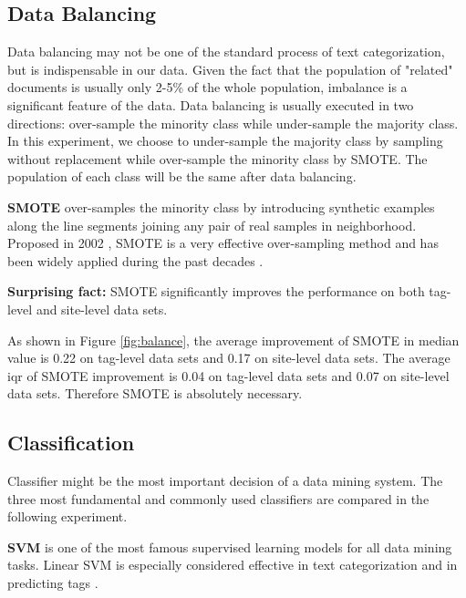 \documentclass{sig-alternate-05-2015}
\begin{document}
\subsection{Data Balancing}
\label{sect:Data Balancing}

Data balancing may not be one of the standard process of text categorization, but is indispensable in our data. Given the fact that the population of "related" documents is usually only 2-5\% of the whole population, imbalance is a significant feature of the data. Data balancing is usually executed in two directions: over-sample the minority class while under-sample the majority class. In this experiment, we choose to under-sample the majority class by sampling without replacement while over-sample the minority class by SMOTE. The population of each class will be the same after data balancing.

\textbf{SMOTE} over-samples the minority class by introducing synthetic examples along the line segments joining any pair of real samples in neighborhood.  Proposed in 2002 \cite{chawla2002smote}, SMOTE is a very effective over-sampling method and has been widely applied during the past decades \cite{han2005borderline,bunkhumpornpat2009safe,luengo2011addressing}. 


\textbf{Surprising fact:} SMOTE significantly improves the performance on both tag-level and site-level data sets.

As shown in Figure \ref{fig:balance}, the average improvement of SMOTE in median value is 0.22 on tag-level data sets and 0.17 on site-level data sets. The average iqr of SMOTE improvement is 0.04 on tag-level data sets and 0.07 on site-level data sets. Therefore SMOTE is absolutely necessary.

\subsection{Classification}

Classifier might be the most important decision of a data mining system. The three most fundamental and commonly used classifiers are compared in the following experiment.

\textbf{SVM} is one of the most famous supervised learning models for all data mining tasks. Linear SVM is especially considered effective in text categorization \cite{joachims2006training} and in predicting tags \cite{moharanatag}. 
\end{document}
